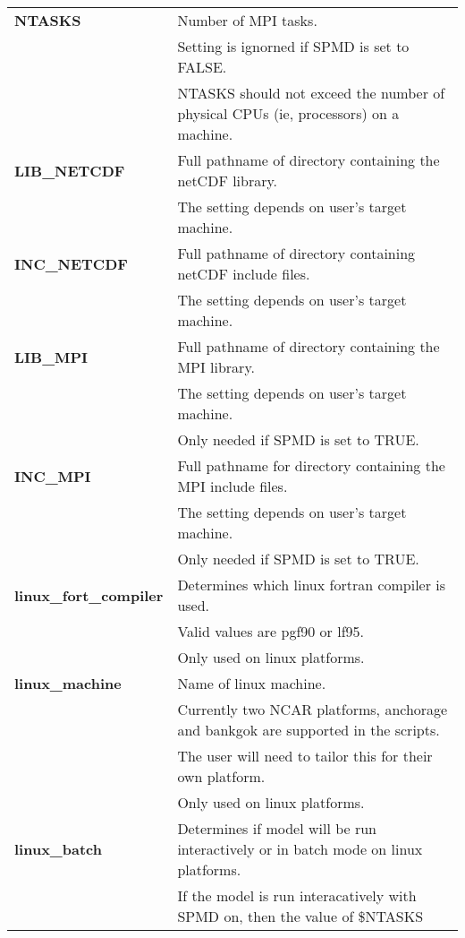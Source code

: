 \begin{longtable}{|p{1.5in}|p{4.5in}|}
{\bf NTASKS}         &   Number of MPI tasks. \\
                     &   Setting is ignorned if SPMD is set to FALSE. \\
	             &   NTASKS should not exceed the number of physical CPUs (ie, processors) 
                         on a machine. \\ \hline 
{\bf LIB\_NETCDF}    &   Full pathname of directory containing the netCDF library. \\
                     &   The setting depends on user's target machine. \\ \hline
{\bf INC\_NETCDF}    &   Full pathname of directory containing netCDF include files. \\ 
                     &   The setting depends on user's target machine. \\ \hline
{\bf LIB\_MPI}       &   Full pathname of directory containing the MPI library. \\ 
                     &   The setting depends on user's target machine. \\ 
                     &   Only needed if SPMD is set to TRUE.  \\ \hline
{\bf INC\_MPI}       &   Full pathname for directory containing the MPI include files. \\
                     &   The setting depends on user's target machine. \\ 
                     &   Only needed if SPMD is set to TRUE.  \\ \hline
{\bf linux\_fort\_compiler} & Determines which linux fortran compiler is used. \\
                            & Valid values are pgf90 or lf95.\\
                            & Only used on linux platforms. \\ \hline
{\bf linux\_machine}        & Name of linux machine. \\
                            & Currently two NCAR platforms, anchorage and bankgok are supported in the scripts. \\
                            & The user will need to tailor this for their own platform. \\
                            & Only used on linux platforms. \\ \hline
{\bf linux\_batch}          & Determines if model will be run interactively or in batch mode on linux platforms. \\
                            & If the model is run interacatively with SPMD on, then the value of \$NTASKS 

\end{longtable}
